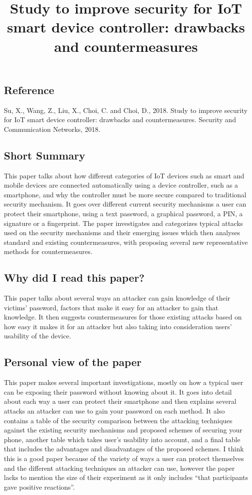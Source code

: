 \documentclass[11pt,a4paper]{article}
\title{Study to improve security for IoT smart device controller: drawbacks and countermeasures}
\author{}
\date{}
\begin{document}
\maketitle

\subsection*{Reference}
Su, X., Wang, Z., Liu, X., Choi, C. and Choi, D., 2018. Study to improve security for IoT smart device controller: drawbacks and countermeasures. Security and Communication Networks, 2018. 

\subsection*{Short Summary} 
This paper talks about how different categories of IoT devices such as smart and mobile devices are connected automatically using a device controller, such as a smartphone, and why the controller must be more secure compared to traditional security mechanism. It goes over different current security mechanisms a user can protect their smartphone, using a text password, a graphical password, a PIN, a signature or a fingerprint. The paper investigates and categorizes typical attacks used on the security mechanisms and their emerging issues which then analyses standard and existing countermeasures, with proposing several new representative methods for countermeasures. 

\subsection*{Why did I read this paper?}
This paper talks about several ways an attacker can gain knowledge of their victims’ password, factors that make it easy for an attacker to gain that knowledge. It then suggests countermeasures for those existing attacks based on how easy it makes it for an attacker but also taking into consideration users’ usability of the device.

\subsection*{Personal view of the paper}
This paper makes several important investigations, mostly on how a typical user can be exposing their password without knowing about it. It goes into detail about each way a user can protect their smartphone and then explains several attacks an attacker can use to gain your password on each method. It also contains a table of the security comparison between the attacking techniques against the existing security mechanisms and proposed schemes of securing your phone, another table which takes user’s usability into account, and a final table that includes the advantages and disadvantages of the proposed schemes. I think this is a good paper because of the variety of ways a user can protect themselves and the different attacking techniques an attacker can use, however the paper lacks to mention the size of their experiment as it only includes “that participants gave positive reactions”.
\end{document}
